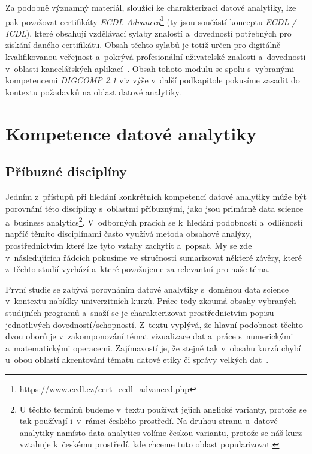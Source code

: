 Za podobně významný materiál, sloužící ke charakterizaci datové analytiky, lze pak považovat certifikáty \emph{ECDL Advanced}\footnote{https://www.ecdl.cz/cert\_ecdl\_advanced.php} (ty jsou součástí konceptu \emph{ECDL / ICDL}), které obsahují vzdělávací sylaby znalostí a~dovedností potřebných pro získání daného certifikátu. Obsah těchto sylabů je totiž určen pro digitálně kvalifikovanou veřejnost a~pokrývá profesionální uživatelské znalosti a~dovednosti v~oblasti kancelářských aplikací~\parencite{ecdl17}. Obsah tohoto modulu se spolu s~vybranými kompetencemi \emph{DIGCOMP 2.1} viz výše v~další podkapitole pokusíme zasadit do kontextu požadavků na oblast datové analytiky.

\hypertarget{kompetence-datovuxe9-analytiky}{%
\section{Kompetence datové analytiky}\label{kompetence-datovuxe9-analytiky}}

\hypertarget{pux159uxedbuznuxe9-discipluxedny}{%
\subsection{Příbuzné disciplíny}\label{pux159uxedbuznuxe9-discipluxedny}}

Jedním z~přístupů při hledání konkrétních kompetencí datové analytiky může být porovnání této disciplíny s~oblastmi příbuznými, jako jsou primárně data science a~business analytics\footnote{U těchto termínů budeme v~textu používat jejich anglické varianty, protože se tak používají i~v~rámci českého prostředí. Na druhou stranu u~datové analytiky namísto data analytics volíme českou variantu, protože se náš kurz vztahuje k~českému prostředí, kde chceme tuto oblast popularizovat.}. V~odborných pracích se k~hledání podobností a~odlišností napříč těmito disciplínami často využívá metoda obsahové analýzy, prostřednictvím které lze tyto vztahy zachytit a~popsat. My se zde v~následujících řádcích pokusíme ve stručnosti sumarizovat některé závěry, které z~těchto studií vychází a~které považujeme za relevantní pro naše téma.

První studie se zabývá porovnáním datové analytiky s~doménou data science v~kontextu nabídky univerzitních kurzů. Práce tedy zkoumá obsahy vybraných studijních programů a~snaží se je charakterizovat prostřednictvím popisu jednotlivých dovedností/schopností. Z~textu vyplývá, že hlavní podobnost těchto dvou oborů je v~zakomponování témat vizualizace dat a~práce s~numerickými a~matematickými operacemi. Zajímavostí je, že stejně tak v~obsahu kurzů chybí u~obou oblastí akcentování tématu datové etiky či správy velkých dat~\parencite[109]{aasheim2015}.

